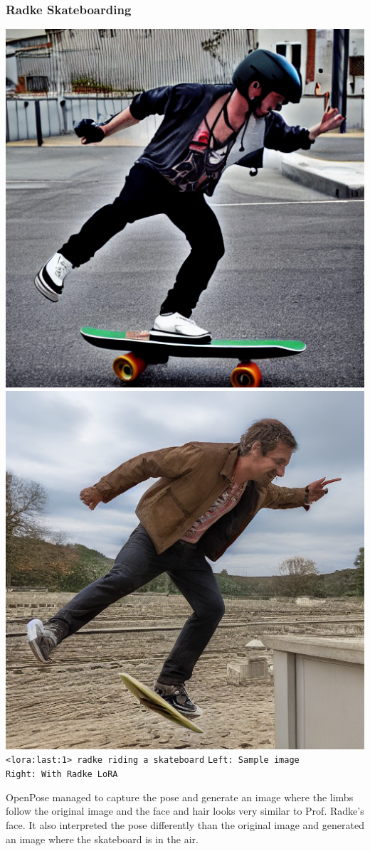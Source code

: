 \documentclass{article}
\begin{document}
\subsubsection{Radke Skateboarding}
\begin{center}
    \includegraphics[scale=0.3]{.imgs/skateboard_base.png}
    \includegraphics[scale=0.3]{.imgs/radke_lora_v1.5_(2)_prompting_skateboard_2.png}\\
    \verb|<lora:last:1> radke riding a skateboard|
    \verb|Left: Sample image              Right: With Radke LoRA|
\end{center}
OpenPose managed to capture the pose and generate an image where the limbs follow the original image and the face and hair looks very similar to Prof. Radke's face. It also interpreted the pose differently than the original image and generated an image where the skateboard is in the air.
\end{document}
